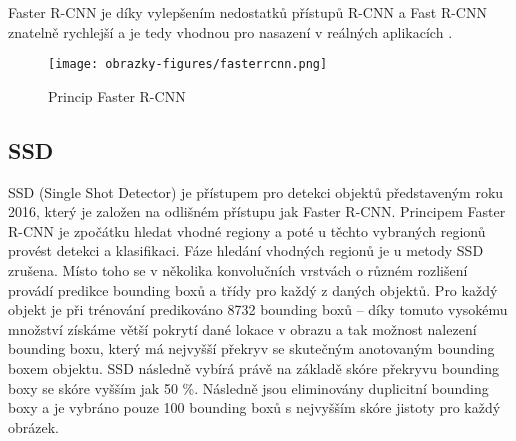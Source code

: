 Faster R-CNN je díky vylepšením nedostatků přístupů R-CNN a Fast R-CNN znatelně rychlejší a je tedy vhodnou pro nasazení v reálných aplikacích \cite{ObjectDetectionAlgorithms}.

\begin{figure}[!htbp]
    \centering
    \texttt{[image: obrazky-figures/fasterrcnn.png]}
    \caption{Princip Faster R-CNN \cite{ObjectDetectionAlgorithms}}
\end{figure} 

\subsection*{SSD}

\iffalse
SSD (Single Shot Detector) je přístupem z roku 2016 pro detekci objektů, která je založena na odlišném principu jak Faster R-CNN. Ve Faster R-CNN je hledání vhodných regionů a klasifikace daných regionů rozdělena, v SSD je fáze hledání vhodných regionů zrušena a metoda využívá pouze jednu konvoluční neuronovou síť. Celý vstupní obraz je na začátku přiveden na vstup konvoluční neuronové sítě. Mapy rysů jsou získány v různých měřítkách. Pomocí 3 $\times$ 3 konvolučního filtru jsou vytvořené na mapách rysů bounding boxy definující daný objekt. Najednou je definovaná hranice objektu a i jeho klasifikace do třídy. Bounding boxy se nacházejí na každé z aktivačních map a proto může být detekce provedena na objektech různého měřítka. Síť dokáže tedy získat predikce z map rysů s různě vysokým rozlišením a tak predikovat objekty rozličných velikostí. Při predikci je vypočítáno skóre pro přítomnost každé třídy pro daný objekt a offset bounding boxu pro to, aby dané ohraničení lépe odpovídalo reálnému tvaru objektu. SSD je přístupem, který zvláště díky více vrstvám pro predikci v různých měřítkách objektu, dosahuje dobré přesnosti za snížení trénovacího času a může být tedy nasazeným v reálných aplikacích \cite{SSD, SSDFasterR-CNNComparison}.
\fi

SSD (Single Shot Detector) je přístupem pro detekci objektů představeným roku 2016, který je založen na odlišném přístupu jak Faster R-CNN. Principem Faster R-CNN je zpočátku hledat vhodné regiony a poté u těchto vybraných regionů provést detekci a klasifikaci. Fáze hledání vhodných regionů je u metody SSD zrušena. Místo toho se v několika konvolučních vrstvách o různém rozlišení provádí predikce bounding boxů a třídy pro každý z daných objektů. Pro každý objekt je při trénování predikováno 8732 bounding boxů -- díky tomuto vysokému množství získáme větší pokrytí dané lokace v obrazu a tak možnost nalezení bounding boxu, který má nejvyšší překryv se skutečným anotovaným bounding boxem objektu. SSD následně vybírá právě na základě skóre překryvu bounding boxy se skóre vyšším jak 50 \%. Následně jsou eliminovány duplicitní bounding boxy a je vybráno pouze 100 bounding boxů s nejvyšším skóre jistoty pro každý obrázek.

